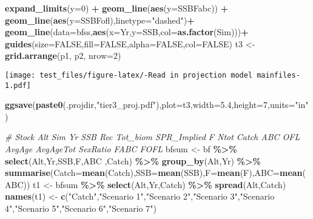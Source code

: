\documentclass[]{article}
\newenvironment{Shaded}{\begin{snugshade}}{\end{snugshade}}
\newcommand{\CommentTok}[1]{\textcolor[rgb]{0.56,0.35,0.01}{\textit{#1}}}
\newcommand{\DataTypeTok}[1]{\textcolor[rgb]{0.13,0.29,0.53}{#1}}
\newcommand{\DecValTok}[1]{\textcolor[rgb]{0.00,0.00,0.81}{#1}}
\newcommand{\FloatTok}[1]{\textcolor[rgb]{0.00,0.00,0.81}{#1}}
\newcommand{\KeywordTok}[1]{\textcolor[rgb]{0.13,0.29,0.53}{\textbf{#1}}}
\newcommand{\NormalTok}[1]{#1}
\newcommand{\OperatorTok}[1]{\textcolor[rgb]{0.81,0.36,0.00}{\textbf{#1}}}
\newcommand{\OtherTok}[1]{\textcolor[rgb]{0.56,0.35,0.01}{#1}}
\newcommand{\StringTok}[1]{\textcolor[rgb]{0.31,0.60,0.02}{#1}}
\begin{document}
\begin{Shaded}
\begin{Highlighting}[]
\StringTok{    }\KeywordTok{expand\_limits}\NormalTok{(}\DataTypeTok{y=}\DecValTok{0}\NormalTok{) }\OperatorTok{+}
\StringTok{    }\KeywordTok{geom\_line}\NormalTok{(}\KeywordTok{aes}\NormalTok{(}\DataTypeTok{y=}\NormalTok{SSBFabc)) }\OperatorTok{+}\StringTok{ }\KeywordTok{geom\_line}\NormalTok{(}\KeywordTok{aes}\NormalTok{(}\DataTypeTok{y=}\NormalTok{SSBFofl),}\DataTypeTok{linetype=}\StringTok{"dashed"}\NormalTok{)}\OperatorTok{+}\StringTok{ }\KeywordTok{geom\_line}\NormalTok{(}\DataTypeTok{data=}\NormalTok{bfss,}\KeywordTok{aes}\NormalTok{(}\DataTypeTok{x=}\NormalTok{Yr,}\DataTypeTok{y=}\NormalTok{SSB,}\DataTypeTok{col=}\KeywordTok{as.factor}\NormalTok{(Sim)))}\OperatorTok{+}\StringTok{ }\KeywordTok{guides}\NormalTok{(}\DataTypeTok{size=}\OtherTok{FALSE}\NormalTok{,}\DataTypeTok{fill=}\OtherTok{FALSE}\NormalTok{,}\DataTypeTok{alpha=}\OtherTok{FALSE}\NormalTok{,}\DataTypeTok{col=}\OtherTok{FALSE}\NormalTok{) }
\NormalTok{  t3 \textless{}{-}}\StringTok{ }\KeywordTok{grid.arrange}\NormalTok{(p1, p2, }\DataTypeTok{nrow=}\DecValTok{2}\NormalTok{)}
\end{Highlighting}
\end{Shaded}

\texttt{[image: test\_files/figure-latex/-Read in projection model mainfiles-1.pdf]}

\begin{Shaded}
\begin{Highlighting}[]
  \KeywordTok{ggsave}\NormalTok{(}\KeywordTok{paste0}\NormalTok{(.projdir,}\StringTok{"tier3\_proj.pdf"}\NormalTok{),}\DataTypeTok{plot=}\NormalTok{t3,}\DataTypeTok{width=}\FloatTok{5.4}\NormalTok{,}\DataTypeTok{height=}\DecValTok{7}\NormalTok{,}\DataTypeTok{units=}\StringTok{"in"}\NormalTok{)}


  \CommentTok{\# Stock Alt Sim Yr  SSB Rec Tot\_biom SPR\_Implied F Ntot Catch ABC OFL AvgAge AvgAgeTot SexRatio FABC FOFL}
\NormalTok{  bfsum \textless{}{-}}\StringTok{ }\NormalTok{bf }\OperatorTok{\%\textgreater{}\%}\StringTok{ }\KeywordTok{select}\NormalTok{(Alt,Yr,SSB,F,ABC ,Catch) }\OperatorTok{\%\textgreater{}\%}\StringTok{ }\KeywordTok{group\_by}\NormalTok{(Alt,Yr) }\OperatorTok{\%\textgreater{}\%}\StringTok{ }\KeywordTok{summarise}\NormalTok{(}\DataTypeTok{Catch=}\KeywordTok{mean}\NormalTok{(Catch),}\DataTypeTok{SSB=}\KeywordTok{mean}\NormalTok{(SSB),}\DataTypeTok{F=}\KeywordTok{mean}\NormalTok{(F),}\DataTypeTok{ABC=}\KeywordTok{mean}\NormalTok{(ABC))}
\NormalTok{  t1 \textless{}{-}}\StringTok{ }\NormalTok{bfsum }\OperatorTok{\%\textgreater{}\%}\StringTok{ }\KeywordTok{select}\NormalTok{(Alt,Yr,Catch) }\OperatorTok{\%\textgreater{}\%}\StringTok{ }\KeywordTok{spread}\NormalTok{(Alt,Catch) }
  \KeywordTok{names}\NormalTok{(t1) \textless{}{-}}\StringTok{ }\KeywordTok{c}\NormalTok{(}\StringTok{"Catch"}\NormalTok{,}\StringTok{"Scenario 1"}\NormalTok{,}\StringTok{"Scenario 2"}\NormalTok{,}\StringTok{"Scenario 3"}\NormalTok{,}\StringTok{"Scenario 4"}\NormalTok{,}\StringTok{"Scenario 5"}\NormalTok{,}\StringTok{"Scenario 6"}\NormalTok{,}\StringTok{"Scenario 7"}\NormalTok{)}
\end{Highlighting}
\end{Shaded}
\end{document}
